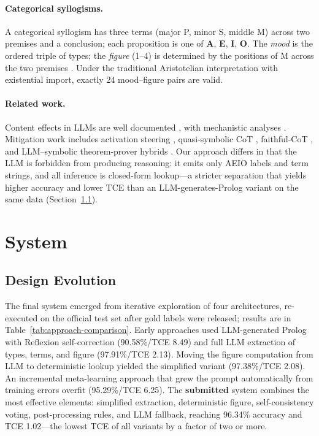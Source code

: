 \documentclass[11pt]{article}
\begin{document}
\paragraph{Categorical syllogisms.} A categorical syllogism has three terms (major P, minor S, middle M) across two premises and a conclusion; each proposition is one of \textbf{A}, \textbf{E}, \textbf{I}, \textbf{O}. The \emph{mood} is the ordered triple of types; the \emph{figure} (1--4) is determined by the positions of M across the two premises \citep{copi2014introduction}. Under the traditional Aristotelian interpretation with existential import, exactly 24 mood--figure pairs are valid.

\paragraph{Related work.} Content effects in LLMs are well documented \citep{dasgupta2022language, eisape2024systematic, bertolazzi2024systematic, ozeki2024exploring, seals2024evaluating}, with mechanistic analyses \citep{kim-etal-2025-reasoning}. Mitigation work includes activation steering \citep{valentino2025mitigating, maraia2026abstract}, quasi-symbolic CoT \citep{ranaldi2025improving}, faithful-CoT \citep{lyu2023faithful, xu2024faithful}, and LLM--symbolic theorem-prover hybrids \citep{quan2024verification}. Our approach differs in that the LLM is forbidden from producing reasoning: it emits only AEIO labels and term strings, and all inference is closed-form lookup---a stricter separation that yields higher accuracy and lower TCE than an LLM-generates-Prolog variant on the same data (Section~\ref{sec:approaches}).


\section{System}

\subsection{Design Evolution}
\label{sec:approaches}

The final system emerged from iterative exploration of four architectures, re-executed on the official test set after gold labels were released; results are in Table~\ref{tab:approach-comparison}. Early approaches used LLM-generated Prolog with Reflexion self-correction \citep{shinn2023reflexion} (90.58\%/TCE 8.49) and full LLM extraction of types, terms, and figure (97.91\%/TCE 2.13). Moving the figure computation from LLM to deterministic lookup yielded the simplified variant (97.38\%/TCE 2.08). An incremental meta-learning approach that grew the prompt automatically from training errors overfit (95.29\%/TCE 6.25). The \textbf{submitted} system combines the most effective elements: simplified extraction, deterministic figure, self-consistency voting, post-processing rules, and LLM fallback, reaching 96.34\% accuracy and TCE 1.02---the lowest TCE of all variants by a factor of two or more.
\end{document}
